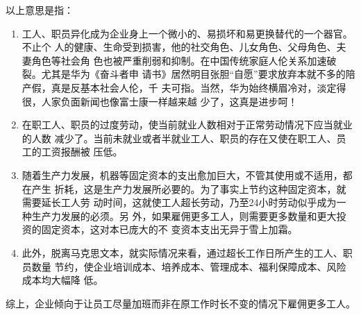 以上意思是指：
\begin{enumerate}
\item 工人、职员异化成为企业身上一个微小的、易损坏和易更换替代的一个器官。不止个
  人的健康、生命受到损害，他的社交角色、儿女角色、父母角色、夫妻角色等社会角
  色也被严重削弱和抑制。在中国传统家庭人伦关系加速破裂。尤其是华为《奋斗者申
  请书》居然明目张胆“自愿”要求放弃本就不多的陪产假，真是反基本社会人伦，千
  夫可指。当然，华为始终横眉冷对，淡定得很，人家负面新闻也像富士康一样越来越
  少了，这真是进步呵！

\item 在职工人、职员的过度劳动，使当前就业人数相对于正常劳动情况下应当就业的人数
  减少了。当前未就业或者半就业工人、职员的存在又使在职工人、员工的工资报酬被
  压低。

\item 随着生产力发展，机器等固定资本的支出愈加巨大，不管其使用或不适用，都在产生
  折耗，这是生产力发展所必要的。为了事实上节约这种固定资本，就需要延长工人劳
  动时间，这就使工人超长劳动，乃至24小时劳动似乎成为一种生产力发展的必须。另
  外，如果雇佣更多工人，则需要更多数量和更大投资的固定资本，这对本已庞大的不
  变资本支出无异于雪上加霜。

\item 此外，脱离马克思文本，就实际情况来看，通过超长工作日所产生的工人、职员数量
  节约，使企业培训成本、培养成本、管理成本、福利保障成本、风险成本均大幅降
  低。
\end{enumerate}

综上，企业倾向于让员工尽量加班而非在原工作时长不变的情况下雇佣更多工人。





